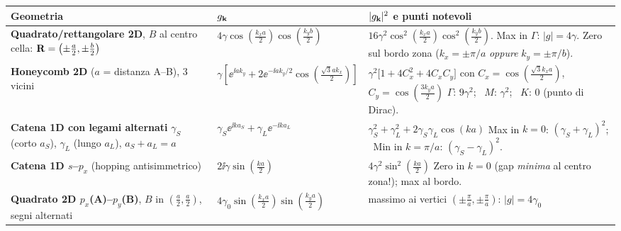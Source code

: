 \begin{center}
\renewcommand{\arraystretch}{1.8}
{\small
\begin{tabular}{p{5.2cm} p{5.4cm} p{5.4cm}}
\toprule
\textbf{Geometria} & $g_{\mathbf{k}}$ & $|g_{\mathbf{k}}|^2$ e punti notevoli \\
\midrule
\textbf{Quadrato/rettangolare 2D}, $B$ al centro cella: $\mathbf{R}=\left(\pm\frac a2,\pm\frac b2\right)$
& $4\gamma\cos\!\left(\frac{k_xa}{2}\right)\cos\!\left(\frac{k_yb}{2}\right)$
& $16\gamma^2\cos^2\!\left(\frac{k_xa}{2}\right)\cos^2\!\left(\frac{k_yb}{2}\right)$. \newline
  Max in $\Gamma$: $|g|=4\gamma$. \newline Zero sul bordo zona ($k_x=\pm\pi/a$ \emph{oppure} $k_y=\pm\pi/b$). \\
\textbf{Honeycomb 2D} ($a$ = distanza A--B), 3 vicini
& $\gamma\left[\ee^{\ii a k_y}\!+2\ee^{-\ii a k_y/2}\cos\!\left(\frac{\sqrt3 ak_x}{2}\right)\right]$
& $\gamma^2\big[1+4C_x^2+4C_xC_y\big]$ \newline con $C_x=\cos\!\left(\frac{\sqrt3k_xa}{2}\right)$, $C_y=\cos\!\left(\frac{3k_ya}{2}\right)$ \newline
  $\Gamma$: $9\gamma^2$; \ $M$: $\gamma^2$; \ $K$: $0$ (punto di Dirac). \\
\textbf{Catena 1D con legami alternati} $\gamma_S$ (corto $a_S$), $\gamma_L$ (lungo $a_L$), $a_S+a_L=a$
& $\gamma_S\ee^{\ii k a_S} + \gamma_L\ee^{-\ii k a_L}$
& $\gamma_S^2+\gamma_L^2+2\gamma_S\gamma_L\cos(ka)$ \newline
  Max in $k=0$: $(\gamma_S+\gamma_L)^2$; \ Min in $k=\pi/a$: $(\gamma_S-\gamma_L)^2$. \\
\textbf{Catena 1D $s$--$p_x$} (hopping antisimmetrico)
& $2\ii\gamma\sin\!\left(\frac{ka}{2}\right)$
& $4\gamma^2\sin^2\!\left(\frac{ka}{2}\right)$ \newline
  Zero in $k=0$ (gap \emph{minima} al centro zona!); max al bordo. \\
\textbf{Quadrato 2D $p_x$(A)--$p_y$(B)}, $B$ in $\left(\frac a2,\frac a2\right)$, segni alternati
& $4\gamma_0\sin\!\left(\frac{k_xa}{2}\right)\sin\!\left(\frac{k_ya}{2}\right)$
& massimo ai vertici $\left(\pm\frac\pi a,\pm\frac\pi a\right)$: $|g|=4\gamma_0$ \\
\bottomrule
\end{tabular}}
\end{center}

